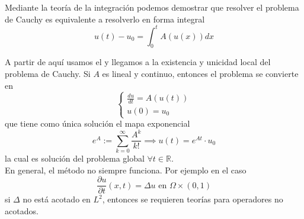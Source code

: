 \noindent 
Mediante la teoría de la integración podemos demostrar que resolver el problema de Cauchy es equivalente a resolverlo en forma integral
\[ u(t) - u_0 = \int_{0}^{t} A(u(x)) dx \]

\noindent 
A partir de aquí usamos el  y llegamos a la existencia y unicidad local del problema de Cauchy. Si $A$ es lineal y continuo, entonces el problema se convierte en 
\begin{equation*}
    \begin{cases} 
        \frac{du}{dt} = A(u(t)) \\ 
        u(0) = u_0 
    \end{cases}
\end{equation*}
que tiene como única solución el mapa exponencial 
$$e^A := \sum_{k=0}^{\infty} \frac{A^k}{k!} \implies u(t) = e^{At} \cdot u_0$$
la cual es solución del problema global $\forall t \in \mathbb{R}$. \\

\noindent 
En general, el método no siempre funciona. Por ejemplo en el caso 
$$\frac{\partial u}{\partial t}(x, t) = \Delta u \text{ en } \Omega \times (0, 1)$$
si $\Delta$ no está acotado en $L^2$, entonces se requieren teorías para operadores no acotados.

